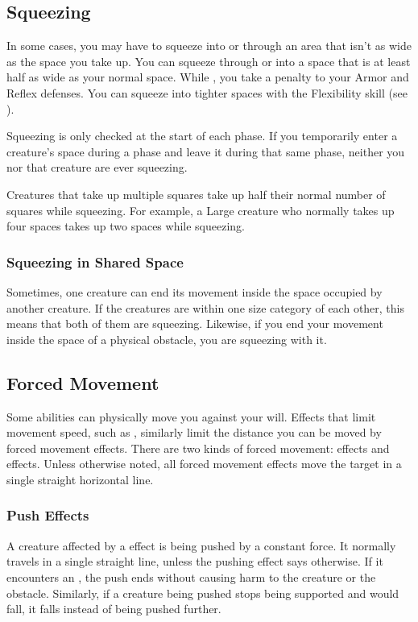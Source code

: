   \subsection{Squeezing}\label{Squeezing}
    In some cases, you may have to squeeze into or through an area that isn't as wide as the space you take up.
    You can squeeze through or into a space that is at least half as wide as your normal space.
    While \squeezing, you take a  penalty to your Armor and Reflex defenses.
    You can squeeze into tighter spaces with the Flexibility skill (see ).

    Squeezing is only checked at the start of each phase.
    If you temporarily enter a creature's space during a phase and leave it during that same phase, neither you nor that creature are ever squeezing.

    Creatures that take up multiple squares take up half their normal number of squares while squeezing.
    For example, a Large creature who normally takes up four spaces takes up two spaces while squeezing.

    \subsubsection{Squeezing in Shared Space}
      Sometimes, one creature can end its movement inside the space occupied by another creature.
      If the creatures are within one size category of each other, this means that both of them are squeezing.
      Likewise, if you end your movement inside the space of a physical obstacle, you are squeezing with it.

  \subsection{Forced Movement}\label{Forced Movement}
    Some abilities can physically move you against your will.
    Effects that limit movement speed, such as , similarly limit the distance you can be moved by forced movement effects.
    There are two kinds of forced movement:  effects and  effects.
    Unless otherwise noted, all forced movement effects move the target in a single straight horizontal line.

    \subsubsection{Push Effects}\label{Push Effects}
      A creature affected by a  effect is being pushed by a constant force.
      It normally travels in a single straight line, unless the pushing effect says otherwise.
      If it encounters an , the push ends without causing harm to the creature or the obstacle.
      Similarly, if a creature being pushed stops being supported and would fall, it falls instead of being pushed further.

